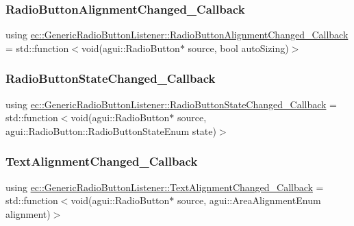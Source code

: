 \subsubsection{\texorpdfstring{Radio\+Button\+Alignment\+Changed\+\_\+\+Callback}{RadioButtonAlignmentChanged\_Callback}}
{\footnotesize\ttfamily using \mbox{\hyperlink{classec_1_1_generic_radio_button_listener_a5abb2fecaaf86a6a0b5c0ce355cdbcb6}{ec\+::\+Generic\+Radio\+Button\+Listener\+::\+Radio\+Button\+Alignment\+Changed\+\_\+\+Callback}} =  std\+::function$<$void(agui\+::\+Radio\+Button$\ast$ source, bool auto\+Sizing)$>$}

\mbox{\label{classec_1_1_generic_radio_button_listener_ab56b850f44f5d460dff301eef04d430b}} 
\subsubsection{\texorpdfstring{Radio\+Button\+State\+Changed\+\_\+\+Callback}{RadioButtonStateChanged\_Callback}}
{\footnotesize\ttfamily using \mbox{\hyperlink{classec_1_1_generic_radio_button_listener_ab56b850f44f5d460dff301eef04d430b}{ec\+::\+Generic\+Radio\+Button\+Listener\+::\+Radio\+Button\+State\+Changed\+\_\+\+Callback}} =  std\+::function$<$void(agui\+::\+Radio\+Button$\ast$ source, agui\+::\+Radio\+Button\+::\+Radio\+Button\+State\+Enum state)$>$}

\mbox{\label{classec_1_1_generic_radio_button_listener_a3e8ead6a08363f220625d2f856b9213d}} 
\subsubsection{\texorpdfstring{Text\+Alignment\+Changed\+\_\+\+Callback}{TextAlignmentChanged\_Callback}}
{\footnotesize\ttfamily using \mbox{\hyperlink{classec_1_1_generic_radio_button_listener_a3e8ead6a08363f220625d2f856b9213d}{ec\+::\+Generic\+Radio\+Button\+Listener\+::\+Text\+Alignment\+Changed\+\_\+\+Callback}} =  std\+::function$<$void(agui\+::\+Radio\+Button$\ast$ source, agui\+::\+Area\+Alignment\+Enum alignment)$>$}



